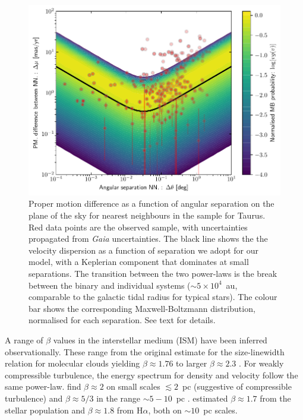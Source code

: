 \documentclass{aa}
\begin{document}
\begin{figure}
    \centering
    \includegraphics[width=\columnwidth]{Figures/obs_dv_fixedpl.pdf}
    \caption{Proper motion difference as a function of angular separation on the plane of the sky for nearest neighbours in the \citet{Luhman23} sample for Taurus. Red data points are the observed sample, with uncertainties propagated from \textit{Gaia} uncertainties. The black line shows the the velocity dispersion as a function of separation we adopt for our model, with a Keplerian component that dominates at small separations. The transition between the two power-laws is the break between the binary and individual systems ($\sim 5\times 10^4$~au, comparable to the galactic tidal radius for typical stars). The colour bar shows the corresponding Maxwell-Boltzmann distribution, normalised for each separation. See text for details.  }
    \label{fig:dvNN_Taurus}
\end{figure}

A range of $\beta$ values in the interstellar medium (ISM) have been inferred observationally. These range from the original estimate for the size-linewidth relation for molecular clouds yielding $\beta \approx 1.76$ \citep{Larson81} to larger $\beta \approx 2.3$ \citep[][for example]{Munch58, Heyer04}. For weakly compressible turbulence, the energy spectrum for density and velocity follow the same power-law. \citet{Qian18} find $\beta\approx 2$ on small scales $\lesssim 2$~pc (suggestive of compressible turbulence) and $\beta \approx 5/3$ in the range $\sim 5{-}10$~pc \citep[suggestive of incompressible turbulence, see also][]{Brunt10}. \citet{Ha22} estimated $\beta \approx 1.7$ from the stellar population and $\beta \approx 1.8$ from H$\alpha$, both on $\sim 10$~pc scales. 
\end{document}
